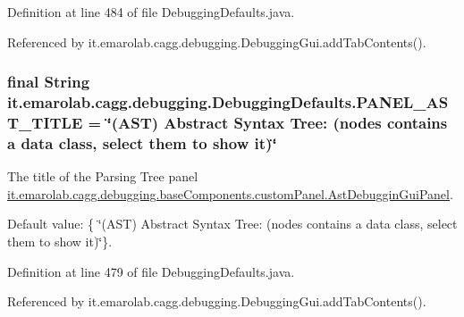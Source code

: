 Definition at line 484 of file Debugging\-Defaults.\-java.



Referenced by it.\-emarolab.\-cagg.\-debugging.\-Debugging\-Gui.\-add\-Tab\-Contents().

\hypertarget{classit_1_1emarolab_1_1cagg_1_1debugging_1_1DebuggingDefaults_a404680a2bf11a877cf3056bf32060005}{
\subsubsection[{P\-A\-N\-E\-L\-\_\-\-A\-S\-T\-\_\-\-T\-I\-T\-L\-E}]{\setlength{\rightskip}{0pt plus 5cm}final String it.\-emarolab.\-cagg.\-debugging.\-Debugging\-Defaults.\-P\-A\-N\-E\-L\-\_\-\-A\-S\-T\-\_\-\-T\-I\-T\-L\-E = \char`\"{}(A\-S\-T) Abstract Syntax Tree\-: (nodes contains a data class, select them to show it)\char`\"{}\hspace{0.3cm}{\ttfamily [static]}}}\label{classit_1_1emarolab_1_1cagg_1_1debugging_1_1DebuggingDefaults_a404680a2bf11a877cf3056bf32060005}
The title of the Parsing Tree panel \hyperlink{classit_1_1emarolab_1_1cagg_1_1debugging_1_1baseComponents_1_1customPanel_1_1AstDebugginGuiPanel}{it.\-emarolab.\-cagg.\-debugging.\-base\-Components.\-custom\-Panel.\-Ast\-Debuggin\-Gui\-Panel}.\par
 Default value\-: \{ \char`\"{}(\-A\-S\-T) Abstract Syntax Tree\-: (nodes contains a data class, select them to show it)\char`\"{}\}. 

Definition at line 479 of file Debugging\-Defaults.\-java.



Referenced by it.\-emarolab.\-cagg.\-debugging.\-Debugging\-Gui.\-add\-Tab\-Contents().

